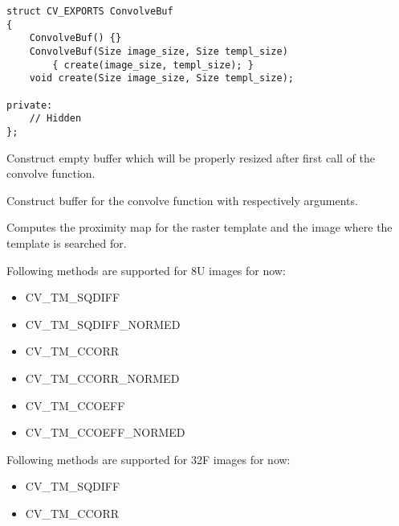 \begin{lstlisting}
struct CV_EXPORTS ConvolveBuf
{
    ConvolveBuf() {}
    ConvolveBuf(Size image_size, Size templ_size) 
        { create(image_size, templ_size); }
    void create(Size image_size, Size templ_size);

private:
    // Hidden
};
\end{lstlisting}



Construct empty buffer which will be properly resized after first call of the convolve function.

Construct buffer for the convolve function with respectively arguments.


Computes the proximity map for the raster template and the image where the template is searched for.


\begin{description}
\end{description}

Following methods are supported for 8U images for now:
\begin{itemize}
\item CV\_TM\_SQDIFF \item CV\_TM\_SQDIFF\_NORMED \item CV\_TM\_CCORR \item CV\_TM\_CCORR\_NORMED \item CV\_TM\_CCOEFF \item CV\_TM\_CCOEFF\_NORMED 
\end{itemize}\par
Following methods are supported for 32F images for now:
\begin{itemize}
\item CV\_TM\_SQDIFF \item CV\_TM\_CCORR
\end{itemize}

